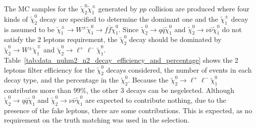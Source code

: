 The MC samples for the $\widetilde{\chi}^{0}_{2} \widetilde{\chi}^{\pm}_{1}$ generated by $pp$ collision are produced where four kinds of $\widetilde{\chi}^{0}_{2}$ decay are specified to determine the dominant one and the $\widetilde{\chi}^{\pm}_{1}$ decay is assumed to be $\widetilde{\chi}^{\pm}_{1} \to W^{\pm} \widetilde{\chi}^{0}_{1} \to f\bar{f} \widetilde{\chi}^{0}_{1}$.
Since $\widetilde{\chi}^{0}_{2} \to q\bar{q} \widetilde{\chi}^{0}_{1}$ and $\widetilde{\chi}^{0}_{2} \to \nu\bar{\nu} \widetilde{\chi}^{0}_{1}$ do not satisfy the 2 leptons requirement, the $\widetilde{\chi}^{0}_{2}$ decay should be dominated by $\widetilde{\chi}^{0}_{2} \to W^{\pm} \widetilde{\chi}^{\mp}_{1}$ and $\widetilde{\chi}^{0}_{2} \to \ell^{+}\ell^{-} \widetilde{\chi}^{0}_{1}$.
Table~\ref{tab:data_nuhm2_n2_decay_efficiency_and_percentage} shows the 2 leptons filter efficiency for the $\widetilde{\chi}^{0}_{2}$ decays considered, the number of events in each decay type, and the percentage in the $\widetilde{\chi}^{0}_{2}$.
Because the $\tilde{\chi}^{0}_{2} \to \ell^{+} \ell^{-} \tilde{\chi}^{0}_{1}$ contributes more than 99\%, the other 3 decays can be negelected.
Although $\tilde{\chi}^{0}_{2} \to q \bar{q} \tilde{\chi}^{0}_{1}$ and $\tilde{\chi}^{0}_{2} \to \nu \bar{\nu} \tilde{\chi}^{0}_{1}$ are expected to contribute nothing, due to the presence of the fake leptons, there are some contributions.
This is expected, as no requirement on the truth matching was used in the selection.

